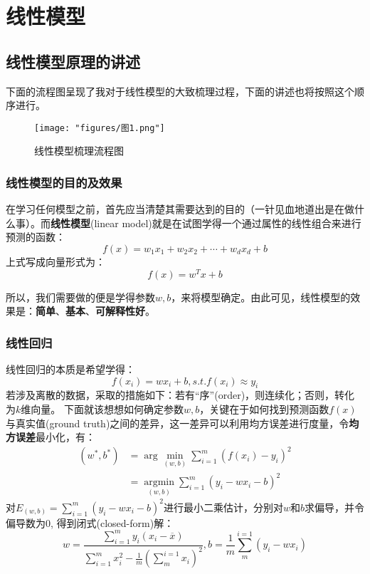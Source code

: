 \section{线性模型}

\subsection{线性模型原理的讲述}
下面的流程图呈现了我对于线性模型的大致梳理过程，下面的讲述也将按照这个顺序进行。
\begin{figure}[h] %
	\centering
	\texttt{[image: "figures/图1.png"]} %
	\caption{线性模型梳理流程图} %
	\label{fig:example} %
\end{figure}
\subsubsection{线性模型的目的及效果}
在学习任何模型之前，首先应当清楚其需要达到的目的（一针见血地道出是在做什么事）。而\textbf{线性模型}(linear model)就是在试图学得一个通过属性的线性组合来进行预测的函数：
\begin{equation}
	f(x)=w_1x_1+w_2x_2+\cdots+w_dx_d+b
\end{equation}
上式写成向量形式为：
\begin{equation}
	f(x)=w^Tx+b
\end{equation}

所以，我们需要做的便是学得参数$w,b$，来将模型确定。由此可见，线性模型的效果是：\textbf{简单}、\textbf{基本}、\textbf{可解释性好}。
\subsubsection{线性回归}
线性回归的本质是希望学得：
\begin{equation}
	f(x_i)=wx_i+b,s.t.f(x_i)\approx y_i
\end{equation}
若涉及离散的数据，采取的措施如下：若有“序”(order)，则连续化；否则，转化为$k$维向量。
下面就该想想如何确定参数$w,b$，关键在于如何找到预测函数$f(x)$与真实值(ground truth)之间的差异，这一差异可以利用均方误差进行度量，令\textbf{均方误差}最小化，有：
\begin{equation}
	\begin{aligned}
		(w^*, b^*)  &= \arg\min_{(w, b)} \sum_{i=1}^m (f(x_i) - y_i)^2 \\
		            &= \underset{(w, b)}{\operatorname*{\arg\min}} \sum_{i=1}^m \left( y_i - wx_i - b \right)^2
	\end{aligned}
\end{equation}
对$E_{(w,b)}=\sum_{i=1}^m(y_i-wx_i-b)^2$进行最小二乘估计，分别对$w$和$b$求偏导，并令偏导数为0, 得到闭式(closed-form)解：
\begin{equation}
	w=\frac{\sum_{i=1}^my_i(x_i-\overline{x})}{\sum_{i=1}^mx_i^2-\frac1m(\sum_m^{i=1}x_i)^2},b=\frac1m\sum_m^{i=1}(y_i-wx_i)
\end{equation}
